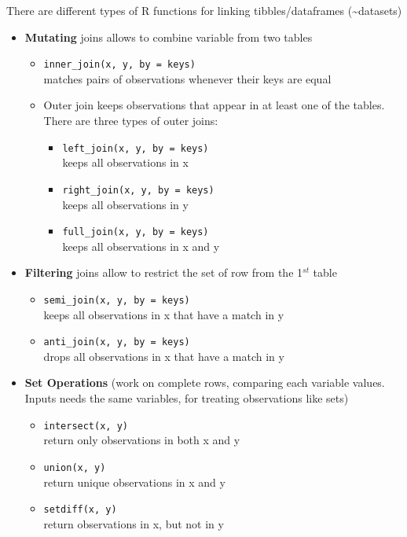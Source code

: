 \documentclass[a4paper]{article}
\begin{document}
			\newpage
		\noindent
			There are different types of R functions for linking tibbles/dataframes (\textasciitilde datasets)
					\begin{itemize}
						\item \textbf{Mutating} joins allows to combine variable from two tables
							\begin{itemize}
								\item \texttt{inner\_join(x, y, by = keys)} \\
								matches pairs of observations whenever their keys are equal
								\item Outer join keeps observations that appear in at least one of the tables.
									There are three types of outer joins:
										\begin{itemize}
											\item \texttt{left\_join(x, y, by = keys)} \\
												keeps all observations in x
											\item \texttt{right\_join(x, y, by = keys)} \\
												keeps all observations in y
											\item \texttt{full\_join(x, y, by = keys)} \\
												keeps all observations in x and y
										\end{itemize}
							\end{itemize}
						\item \textbf{Filtering} joins allow to restrict the set of row from the 1$^{st}$ table
							\begin{itemize}
								\item \texttt{semi\_join(x, y, by = keys)} \\
									keeps all observations in x that have a match in y
								\item \texttt{anti\_join(x, y, by = keys)} \\
									drops all observations in x that have a match in y
							\end{itemize}
						\item \textbf{Set Operations} (work on complete rows, comparing each variable values.
							Inputs needs the same variables, for treating observations like sets)
							\begin{itemize}
								\item \texttt{intersect(x, y)} \\
									return only observations in both x and y
								\item \texttt{union(x, y)} \\
									return unique observations in x and y
								\item \texttt{setdiff(x, y)} \\
									return observations in x, but not in y
							\end{itemize}
					\end{itemize}
				
\end{document}
